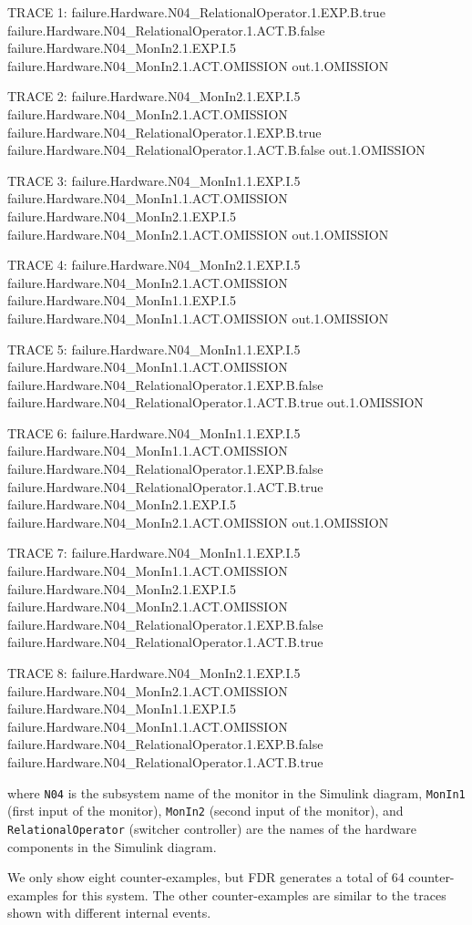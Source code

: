 \documentclass[12pt,openright,twoside,a4paper,oldfontcommands,english,brazil,draft]{abntex2}
\theoremstyle{theo}
\newenvironment{snippetcspm}[1][2]
{
\ifthenelse{\equal{#1}{0}}
    {\tiny}
    {
    \ifthenelse{\equal{#1}{1}}
        {\scriptsize}
        {
        \ifthenelse{\equal{#1}{2}}
            {\footnotesize}
            {\small}
        }
    }
\verbatim
}
{
\endverbatim
}
\newcommand{\simulink}{Simulink\xspace}
\begin{document}
\begin{snippetcspm}[1]
TRACE 1:
failure.Hardware.N04_RelationalOperator.1.EXP.B.true
failure.Hardware.N04_RelationalOperator.1.ACT.B.false
failure.Hardware.N04_MonIn2.1.EXP.I.5
failure.Hardware.N04_MonIn2.1.ACT.OMISSION
out.1.OMISSION

TRACE 2:
failure.Hardware.N04_MonIn2.1.EXP.I.5
failure.Hardware.N04_MonIn2.1.ACT.OMISSION
failure.Hardware.N04_RelationalOperator.1.EXP.B.true
failure.Hardware.N04_RelationalOperator.1.ACT.B.false
out.1.OMISSION

TRACE 3:
failure.Hardware.N04_MonIn1.1.EXP.I.5
failure.Hardware.N04_MonIn1.1.ACT.OMISSION
failure.Hardware.N04_MonIn2.1.EXP.I.5
failure.Hardware.N04_MonIn2.1.ACT.OMISSION
out.1.OMISSION

TRACE 4:
failure.Hardware.N04_MonIn2.1.EXP.I.5
failure.Hardware.N04_MonIn2.1.ACT.OMISSION
failure.Hardware.N04_MonIn1.1.EXP.I.5
failure.Hardware.N04_MonIn1.1.ACT.OMISSION
out.1.OMISSION

TRACE 5:
failure.Hardware.N04_MonIn1.1.EXP.I.5
failure.Hardware.N04_MonIn1.1.ACT.OMISSION
failure.Hardware.N04_RelationalOperator.1.EXP.B.false
failure.Hardware.N04_RelationalOperator.1.ACT.B.true
out.1.OMISSION

TRACE 6:
failure.Hardware.N04_MonIn1.1.EXP.I.5
failure.Hardware.N04_MonIn1.1.ACT.OMISSION
failure.Hardware.N04_RelationalOperator.1.EXP.B.false
failure.Hardware.N04_RelationalOperator.1.ACT.B.true
failure.Hardware.N04_MonIn2.1.EXP.I.5
failure.Hardware.N04_MonIn2.1.ACT.OMISSION
out.1.OMISSION

TRACE 7:
failure.Hardware.N04_MonIn1.1.EXP.I.5
failure.Hardware.N04_MonIn1.1.ACT.OMISSION
failure.Hardware.N04_MonIn2.1.EXP.I.5
failure.Hardware.N04_MonIn2.1.ACT.OMISSION
failure.Hardware.N04_RelationalOperator.1.EXP.B.false
failure.Hardware.N04_RelationalOperator.1.ACT.B.true

TRACE 8:
failure.Hardware.N04_MonIn2.1.EXP.I.5
failure.Hardware.N04_MonIn2.1.ACT.OMISSION
failure.Hardware.N04_MonIn1.1.EXP.I.5
failure.Hardware.N04_MonIn1.1.ACT.OMISSION
failure.Hardware.N04_RelationalOperator.1.EXP.B.false
failure.Hardware.N04_RelationalOperator.1.ACT.B.true
\end{snippetcspm}
%
where \verb$N04$ is the subsystem name of the monitor in the \simulink diagram, \verb$MonIn1$ (first input of the monitor), \verb$MonIn2$ (second input of the monitor), and \verb$RelationalOperator$ (switcher controller) are the names of the hardware components in the \simulink diagram.

We only show eight counter-examples, but \acs{FDR} generates a total of 64 counter-examples for this system.
The other counter-examples are similar to the traces shown with different internal events.
\end{document}
